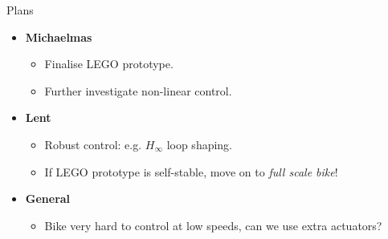\documentclass{beamer}
\begin{document}
\begin{frame}{Plans}

  \begin{itemize}
  	\setlength\itemsep{1em}
  	
	\item{\textbf{Michaelmas}}  	
	\begin{itemize}
		\item{Finalise LEGO prototype.}
		\item{Further investigate non-linear control.}
	\end{itemize}	  	
  	
	\item{\textbf{Lent}}
	\begin{itemize}
		\item{Robust control: e.g. $H_\infty$ loop shaping.}
		\item{If LEGO prototype is self-stable, move on to \textit{full scale bike}!}
	\end{itemize}		
  
	\item{\textbf{General}}
	\begin{itemize}
		\item{Bike very hard to control at low speeds, can we use extra actuators?}
	\end{itemize}  
  
  \end{itemize}

\end{frame}
\end{document}
